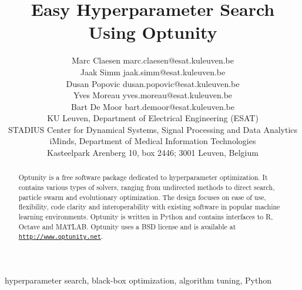 \documentclass[twoside,11pt]{article}
\newcommand{\optunity}{{\sc Optunity}\xspace}
\begin{document}
\title{Easy Hyperparameter Search Using Optunity}

\author{\name Marc Claesen \email marc.claesen@esat.kuleuven.be  \\ 
\name Jaak Simm \email jaak.simm@esat.kuleuven.be   \\ 
\name Dusan Popovic \email dusan.popovic@esat.kuleuven.be   \\ 
\name Yves Moreau \email yves.moreau@esat.kuleuven.be \\
\name Bart De Moor \email bart.demoor@esat.kuleuven.be  \\ 
\addr KU Leuven, Department of Electrical Engineering (ESAT) \\
STADIUS Center for Dynamical Systems, Signal Processing and Data Analytics \\ 
iMinds, Department of Medical Information Technologies \\
Kasteelpark Arenberg 10, box 2446; 3001 Leuven, Belgium
}


\maketitle

\begin{abstract}%
    \optunity is a free software package dedicated to hyperparameter optimization. It contains various types of solvers, ranging from undirected methods to direct search, particle swarm and evolutionary optimization. The design focuses on ease of use, flexibility, code clarity and interoperability with existing software in popular machine learning environments. \optunity is written in Python and contains interfaces to R, Octave and MATLAB.  \optunity uses a BSD license and is available at \texttt{\url{http://www.optunity.net}}.
\end{abstract}

\begin{keywords}
  hyperparameter search, black-box optimization, algorithm tuning, Python
\end{keywords}
\end{document}

